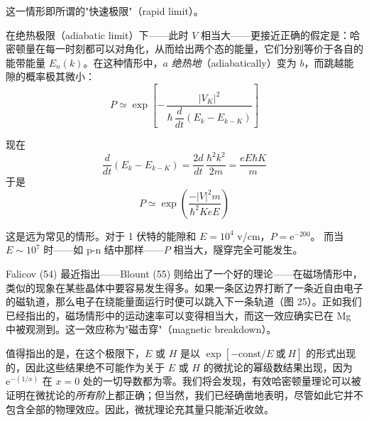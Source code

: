 这一情形即所谓的"快速极限"（rapid limit）。

在绝热极限（adiabatic limit）下——此时 $V$ 相当大——更接近正确的假定是：哈密顿量在每一时刻都可以对角化，从而给出两个态的能量，它们分别等价于各自的能带能量 $E_n(k)$。在这种情形中，$a$ \emph{绝热地}（adiabatically）变为 $b$，而跳越能隙的概率极其微小：
\begin{equation*}
P \simeq \exp\left[-\,\frac{|V_K|^2}{\hbar\,\dfrac{d}{dt}\left(E_k - E_{k-K}\right)}\right]
\end{equation*}


现在
\begin{equation*}
\frac{d}{dt}\left(E_k - E_{k-K}\right) = \frac{2d}{dt}\,\frac{\hbar^2k^2}{2m} = \frac{eE\hbar K}{m}
\end{equation*}
于是
\begin{equation*}
P \simeq \exp\left(\frac{-|V|^2 m}{\hbar^2KeE}\right)
\end{equation*}

这是远为常见的情形。对于 1 伏特的能隙和 $E = 10^4$ v/cm，$P = \mathrm{e}^{-200}$。
而当 $E \sim 10^7$ 时——如 p-n 结中那样——$P$ 相当大，隧穿完全可能发生。

Falicov (54) 最近指出——Blount (55) 则给出了一个好的理论——在磁场情形中，类似的现象在某些晶体中要容易发生得多。如果一条区边界打断了一条近自由电子的磁轨道，那么电子在绕能量面运行时便可以跳入下一条轨道（图 25）。正如我们已经指出的，磁场情形中的运动速率可以变得相当大，而这一效应确实已在 Mg 中被观测到。这一效应称为"磁击穿"（magnetic breakdown）。

值得指出的是，在这个极限下，$E$ 或 $H$ 是以 $\exp[-\mathrm{const}/E\ 或\ H]$ 的形式出现的，因此这些结果绝不可能作为关于 $E$ 或 $H$ 的微扰论的幂级数结果出现，因为 $\mathrm{e}^{-(1/x)}$ 在 $x=0$ 处的一切导数都为零。我们将会发现，有效哈密顿量理论可以被证明在微扰论的\emph{所有阶}上都正确；但当然，我们已经确凿地表明，尽管如此它并不包含全部的物理效应。因此，微扰理论充其量只能渐近收敛。
